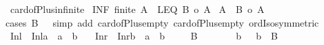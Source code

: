 \begin{isabellebody}
\ card{\isacharunderscore}{\kern0pt}of{\isacharunderscore}{\kern0pt}Plus{\isacharunderscore}{\kern0pt}infinite{}{\isacharcolon}{\kern0pt}\isanewline
{}\ INF{\isacharcolon}{\kern0pt}\ {\isachardoublequoteopen}{\isasymnot}finite\ A{\isachardoublequoteclose}\ \ LEQ{\isacharcolon}{\kern0pt}\ {\isachardoublequoteopen}{\isacharbar}{\kern0pt}B{\isacharbar}{\kern0pt}\ {\isasymle}o\ {\isacharbar}{\kern0pt}A{\isacharbar}{\kern0pt}{\isachardoublequoteclose}\isanewline
{}\ {\isachardoublequoteopen}{\isacharbar}{\kern0pt}A\ {\isacharless}{\kern0pt}{\isacharplus}{\kern0pt}{\isachargreater}{\kern0pt}\ B{\isacharbar}{\kern0pt}\ {\isacharequal}{\kern0pt}o\ {\isacharbar}{\kern0pt}A{\isacharbar}{\kern0pt}{\isachardoublequoteclose}\isanewline
%
\isadelimproof
%
\endisadelimproof
%
\isatagproof
{}\isamarkupfalse%
{\isacharparenleft}{\kern0pt}cases\ {\isachardoublequoteopen}B\ {\isacharequal}{\kern0pt}\ {\isacharbraceleft}{\kern0pt}{\isacharbraceright}{\kern0pt}{\isachardoublequoteclose}{\isacharcomma}{\kern0pt}\ simp\ add{\isacharcolon}{\kern0pt}\ card{\isacharunderscore}{\kern0pt}of{\isacharunderscore}{\kern0pt}Plus{\isacharunderscore}{\kern0pt}empty{}\ card{\isacharunderscore}{\kern0pt}of{\isacharunderscore}{\kern0pt}Plus{\isacharunderscore}{\kern0pt}empty{}\ ordIso{\isacharunderscore}{\kern0pt}symmetric{\isacharparenright}{\kern0pt}\isanewline
\ \ \isamarkupfalse%
\ {\isacharquery}{\kern0pt}Inl\ {\isacharequal}{\kern0pt}\ {\isachardoublequoteopen}Inl{\isacharcolon}{\kern0pt}{\isacharcolon}{\kern0pt}{\isacharprime}{\kern0pt}a\ {\isasymRightarrow}\ {\isacharprime}{\kern0pt}a\ {\isacharplus}{\kern0pt}\ {\isacharprime}{\kern0pt}b{\isachardoublequoteclose}\ \ \isamarkupfalse%
\ {\isacharquery}{\kern0pt}Inr\ {\isacharequal}{\kern0pt}\ {\isachardoublequoteopen}Inr{\isacharcolon}{\kern0pt}{\isacharcolon}{\kern0pt}{\isacharprime}{\kern0pt}b\ {\isasymRightarrow}\ {\isacharprime}{\kern0pt}a\ {\isacharplus}{\kern0pt}\ {\isacharprime}{\kern0pt}b{\isachardoublequoteclose}\isanewline
\ \ \isamarkupfalse%
\ {\isacharasterisk}{\kern0pt}{\isacharcolon}{\kern0pt}\ {\isachardoublequoteopen}B\ {\isasymnoteq}\ {\isacharbraceleft}{\kern0pt}{\isacharbraceright}{\kern0pt}{\isachardoublequoteclose}\isanewline
\ \ \isamarkupfalse%
\ \isamarkupfalse%
\ b{}\ \ {}{\isacharcolon}{\kern0pt}\ {\isachardoublequoteopen}b{}\ {\isasymin}\ B{\isachardoublequoteclose}\ \isamarkupfalse%

\end{isabellebody}
